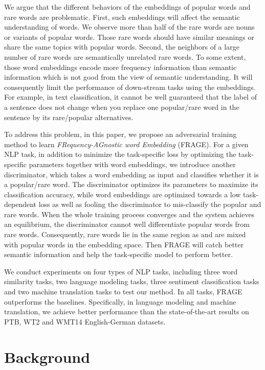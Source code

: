 \documentclass{article}
\begin{document}
We argue that the different behaviors of the embeddings of popular words and rare words are problematic. First, such embeddings will affect the semantic understanding of words. We observe more than half of the rare words are nouns or variants of popular words. Those rare words should have similar meanings or share the same topics with popular words. Second, the neighbors of a large number of rare words are semantically unrelated rare words. To some extent, those word embeddings encode more frequency information than semantic information which is not good from the view of semantic understanding. It will consequently limit the performance of down-stream tasks using the embeddings. For example, in text classification, it cannot be well guaranteed that the label of a sentence does not change when you replace one popular/rare word in the sentence by its rare/popular alternatives.

To address this problem, in this paper, we propose an adversarial training method to learn \emph{FRequency-AGnostic word Embedding} (FRAGE). For a given NLP task, in addition to minimize the task-specific loss by optimizing the task-specific parameters together with word embeddings, we introduce another discriminator, which takes a word embedding as input and classifies whether it is a popular/rare word. The discriminator optimizes its parameters to maximize its classification accuracy, while word embeddings are optimized towards a low task-dependent loss as well as fooling the discriminator to mis-classify the popular and rare words. When the whole training process converges and the system achieves an equilibrium,  the discriminator cannot well differentiate popular words from rare words. Consequently, rare words lie in the same region as and are mixed with popular words in the embedding space. Then FRAGE will catch better semantic information and help the task-specific model to perform better.

We conduct experiments on four types of NLP tasks, including three word similarity tasks, two language modeling tasks, three sentiment classification tasks and two machine translation tasks to test our method. In all tasks, FRAGE outperforms the baselines. Specifically, in language modeling and machine translation, we achieve better performance than the state-of-the-art results on PTB, WT2 and WMT14 English-German datasets.


\section{Background}
\end{document}
